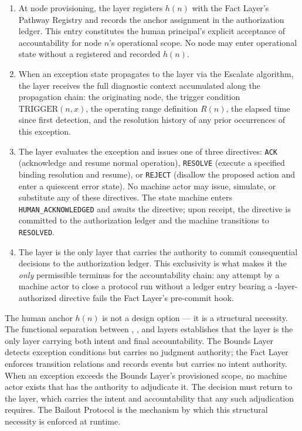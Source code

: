 \begin{enumerate}\itemsep=0pt
\item[\emph{Registration.}] At node provisioning, the \purpose{} layer registers $h(n)$ with the Fact Layer's Pathway Registry and records the anchor assignment in the authorization ledger. This entry constitutes the human principal's explicit acceptance of accountability for node $n$'s operational scope. No node may enter operational state without a registered and recorded $h(n)$.

\item[\emph{Exception reception.}] When an exception state propagates to the \purpose{} layer via the Escalate algorithm, the \purpose{} layer receives the full diagnostic context accumulated along the propagation chain: the originating node, the trigger condition $\text{TRIGGER}(n, x)$, the operating range definition $R(n)$, the elapsed time since first detection, and the resolution history of any prior occurrences of this exception.

\item[\emph{Directive issuance.}] The \purpose{} layer evaluates the exception and issues one of three directives: \texttt{ACK} (acknowledge and resume normal operation), \texttt{RESOLVE} (execute a specified binding resolution and resume), or \texttt{REJECT} (disallow the proposed action and enter a quiescent error state). No machine actor may issue, simulate, or substitute any of these directives. The state machine enters \texttt{HUMAN\_ACKNOWLEDGED} and awaits the directive; upon receipt, the directive is committed to the authorization ledger and the machine transitions to \texttt{RESOLVED}.

\item[\emph{Consequential commitment.}] The \purpose{} layer is the only layer that carries the authority to commit consequential decisions to the authorization ledger. This exclusivity is what makes it the \emph{only} permissible terminus for the accountability chain: any attempt by a machine actor to close a protocol run without a ledger entry bearing a \purpose-layer-authorized directive fails the Fact Layer's pre-commit hook.
\end{enumerate}

The human anchor $h(n)$ is not a design option --- it is a structural necessity. The functional separation between \purpose{}, \bounds{}, and \fact{} layers establishes that the \purpose{} layer is the only layer carrying both intent and final accountability. The Bounds Layer detects exception conditions but carries no judgment authority; the Fact Layer enforces transition relations and records events but carries no intent authority. When an exception exceeds the Bounds Layer's provisioned scope, no machine actor exists that has the authority to adjudicate it. The decision must return to the \purpose{} layer, which carries the intent and accountability that any such adjudication requires. The Bailout Protocol is the mechanism by which this structural necessity is enforced at runtime.


